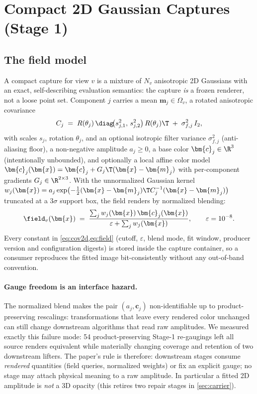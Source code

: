 \section{Compact 2D Gaussian Captures (Stage 1)}
\label{sec:compact-capture}

\subsection{The field model}
\label{sec:field-model}

A compact capture for view $v$ is a mixture of $N_v$ anisotropic 2D Gaussians with an exact,
self-describing evaluation semantics: the capture \emph{is} a frozen renderer, not a loose
point set.  Component $j$ carries a mean $\bm{m}_j \in \Omega_v$, a rotated anisotropic
covariance
\begin{equation}
  C_j \;=\; R(\theta_j)\,\diag\!\big(s_{j,1}^2,\, s_{j,2}^2\big)\,R(\theta_j)\T
  \;+\; \sigma_{f,j}^2\, I_2,
  \label{eq:cov2d}
\end{equation}
with scales $s_j$, rotation $\theta_j$, and an optional isotropic filter variance
$\sigma_{f,j}^2$ (anti-aliasing floor), a non-negative amplitude $a_j \ge 0$, a base color
$\bm{c}_j \in \R^3$ (intentionally unbounded), and optionally a local affine color model
$\bm{c}_j(\bm{x}) = \bm{c}_j + G_j\T(\bm{x} - \bm{m}_j)$ with per-component gradients
$G_j \in \R^{2\times 3}$.  With the unnormalized Gaussian kernel
$w_j(\bm{x}) = a_j \exp\!\big({-\tfrac12 (\bm{x}-\bm{m}_j)\T C_j^{-1} (\bm{x}-\bm{m}_j)}\big)$
truncated at a $3\sigma$ support box, the field renders by normalized blending:
\begin{equation}
  \field_v(\bm{x})
  \;=\;
  \frac{\sum_j w_j(\bm{x})\, \bm{c}_j(\bm{x})}
       {\varepsilon + \sum_j w_j(\bm{x})},
  \qquad \varepsilon = 10^{-8}.
  \label{eq:field}
\end{equation}
Every constant in \cref{eq:cov2d,eq:field} (cutoff, $\varepsilon$, blend mode, fit window,
producer version and configuration digests) is stored inside the capture container, so a
consumer reproduces the fitted image bit-consistently without any out-of-band
convention.

\paragraph{Gauge freedom is an interface hazard.}
The normalized blend makes the pair $(a_j, \bm{c}_j)$ non-identifiable up to
product-preserving rescalings: transformations that leave every rendered color unchanged can
still change downstream algorithms that read raw amplitudes.  We measured exactly this
failure mode: 54 product-preserving Stage-1 re-gaugings left all source renders equivalent
while materially changing coverage and retention of two downstream
lifters.  The paper's rule is therefore: downstream stages
consume \emph{rendered} quantities (field queries, normalized weights) or fix an explicit
gauge; no stage may attach physical meaning to a raw amplitude.  In particular a fitted 2D
amplitude is \emph{not} a 3D opacity (this retires two repair stages in \cref{sec:carrier}).

